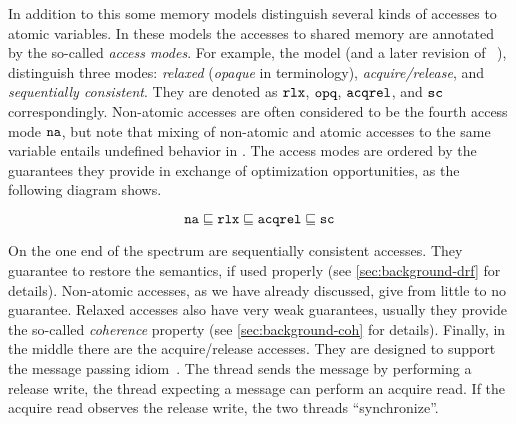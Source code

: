In addition to this some memory models distinguish 
several kinds of accesses to atomic variables.
In these models the accesses to shared memory are annotated by the 
so-called \emph{access modes}.
For example, the \CPP model (and a later revision of 
\Java~\cite{Bender-Palsberg:OOPSLA19}), distinguish 
three modes: \emph{relaxed} (\emph{opaque} in \Java terminology), 
\emph{acquire/release}, and \emph{sequentially consistent}.
They are denoted as $\mathtt{rlx}$, $\mathtt{opq}$, ${\mathtt{acqrel}}$, and ${\mathtt{sc}}$ correspondingly.
Non-atomic accesses are often considered to be the fourth access mode $\mathtt{na}$, 
but note that mixing of non-atomic and atomic accesses to the same variable 
entails undefined behavior in \CPP.
The access modes are ordered by the guarantees they provide
in exchange of optimization opportunities, as the following 
diagram shows.

$$ \mathtt{na} \sqsubseteq \mathtt{rlx} \sqsubseteq {\mathtt{acqrel}} \sqsubseteq {\mathtt{sc}} $$

On the one end of the spectrum are sequentially consistent accesses. 
They guarantee to restore the \SC semantics, if used properly 
(see \cref{sec:background-drf} for details).
Non-atomic accesses, as we have already discussed, give 
from little to no guarantee. 
Relaxed accesses also have very weak guarantees, 
usually they provide the so-called \emph{coherence} property
(see \cref{sec:background-coh} for details).
Finally, in the middle there are the acquire/release accesses. 
They are designed to support the message passing idiom~\cite{Lahav-al:POPL16}.
The thread sends the message by performing a release write, 
the thread expecting a message can perform an acquire read. 
If the acquire read observes the release write, the two 
threads ``synchronize''. 







